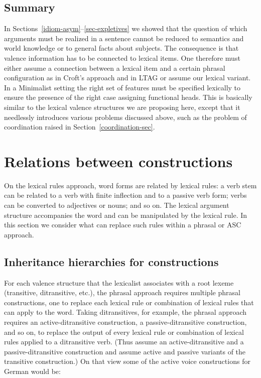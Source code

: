 \begin{exe}
\begin{xlist}[iv.]
\begin{exe}
\begin{xlist}[iv.]
\subsection{Summary}
\label{sec-underspec-summary}

In Sections~\ref{idiom-asym}--\ref{sec-expletives} we showed that the question of which
arguments must be realized in a sentence cannot be reduced to semantics and world knowledge or to
general facts about subjects. The consequence is that valence information has to be connected to
lexical items. One therefore must either assume a connection between a lexical item and a certain phrasal
configuration as in Croft's approach \citeyearpar{Croft2003a} and in LTAG or assume our lexical
variant. In a Minimalist setting the right set of features must be specified lexically to
ensure the presence of the right case assigning functional heads. This is basically %
similar to the lexical valence structures we are proposing here, except that it needlessly introduces  
various problems discussed above, such as the problem of coordination raised in Section~\ref{coordination-sec}. 

\section{Relations between constructions}
\label{relations-sec}
On the lexical rules approach, word forms are related by lexical rules: a verb
stem can be related to a verb with finite inflection and to a passive verb form; verbs can be converted
to adjectives or nouns; and so on.  The lexical argument structure accompanies the word and can be manipulated by the lexical rule.  
In this section we consider what can replace such rules within a phrasal or ASC approach.  



\subsection{Inheritance hierarchies for constructions}
\label{inheritance-sec}
\label{Abschnitt-Croft}


For each valence structure that the lexicalist associates with a root lexeme (transitive, ditransitive, etc.), 
the phrasal approach requires multiple phrasal constructions, one to replace each lexical rule or combination of lexical rules that can apply to the word.  
Taking ditransitives, for example, the phrasal approach requires an active-ditransitive construction, a passive-ditransitive construction, and 
so on, to replace the output of every lexical rule or combination of lexical rules applied to a ditransitive verb.  
(Thus  assume an active-ditransitive and a
passive-ditransitive construction and  assume active and passive
variants of the transitive construction.)  On that view some of the active voice constructions for German would be:


\end{xlist}
\end{exe}
\end{xlist}
\end{exe}
